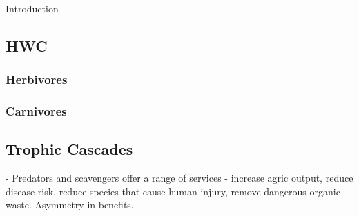 Introduction

\subsection{HWC}

\subsubsection{Herbivores}

\subsubsection{Carnivores}

\subsection{Trophic Cascades}

\cite{O_Bryan_2018} - Predators and scavengers offer a range of services - increase agric output, reduce disease risk, reduce species that cause human injury, remove dangerous organic waste. Asymmetry in benefits.


